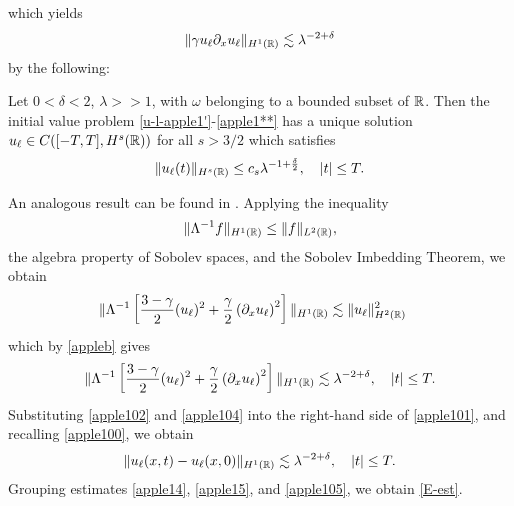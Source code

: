 %
%
which yields 
%
%
\begin{equation}
\begin{split}
\|\gamma u_\ell \partial_x u_\ell \|_{H^1(\mathbb{R})} \lesssim \lambda^{-2 + \delta}
\label{apple102}
\end{split}
\end{equation}
%
%
%
%
by the following:
%
%
%
%
%
% 				
%
%
%
%
%
\begin{lemma}
\label{appleb}
Let $0<\delta<2$, $\lambda >>1$, with $\omega$ belonging to a bounded
subset of $\mathbb{R}$. Then the initial value problem
\eqref{u-l-apple1'}-\eqref{apple1**}
has a unique solution
$u_\ell \in C( [-T,T], H^s(\mathbb{R}))$ for all $s
> 3/2$ which satisfies
%
%
\begin{equation}
\label{apple10'}
\|u_\ell(t)\|_{H^s(\mathbb{R})} \le c_s \lambda^{-1 +
\frac{\delta}{2}}, \quad |t| \le T.
\end{equation}
%
%
\end{lemma}
%
An analogous result can be found in \cite{Himonas:2009fk}. 
%
%
%
Applying the inequality %
%
\begin{equation*}
\begin{split}
\|\Lambda^{-1} f \|_{H^1(\mathbb{R})} \le \|f\|_{L^2(\mathbb{R})},
\label{apple27}
\end{split}
\end{equation*}
%
%
the algebra property of Sobolev spaces, and
the Sobolev Imbedding Theorem, we obtain
%
%
\begin{equation*}
\begin{split}
\|\Lambda^{-1} \left[ \frac{3-\gamma}{2}(u_\ell)^2 +
\frac{\gamma}{2}\left( \partial_x u_\ell \right)^2 \right] \|_{H^1(\mathbb{R})}
& \lesssim \|u_\ell\|_{H^2(\mathbb{R})}^2
\end{split}
\end{equation*}
%
%
which by \cref{appleb} gives
%
%
\begin{equation}
\begin{split}
\|\Lambda^{-1} \left[ \frac{3-\gamma}{2}(u_\ell)^2 +
\frac{\gamma}{2}\left( \partial_x u_\ell \right)^2 \right] \|_{H^1(\mathbb{R})}
\lesssim \lambda^{-2 + \delta}, \quad |t| \le T.
\label{apple104}
\end{split}
\end{equation}
%
%
Substituting \eqref{apple102} and \eqref{apple104} into the right-hand side 
of
\eqref{apple101}, and recalling \eqref{apple100}, we obtain
%
%
\begin{equation}
\begin{split}
\|u_\ell(x,t) - u_\ell(x,0)\|_{H^1(\mathbb{R})} \lesssim \lambda^{-2 + \delta}, 
\quad |t| \le T.
\label{apple105}
\end{split}
\end{equation}
%
%
Grouping estimates \eqref{apple14}, \eqref{apple15}, and \eqref{apple105}, 
we obtain \eqref{E-est}. \qquad \qedsymbol
%
%
%
%

